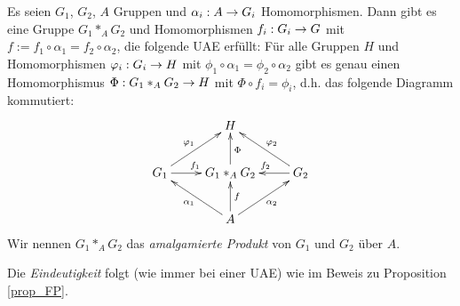 \documentclass[a4paper, 12pt, twoside]{article}
\begin{document}
\PROP\label{prop_AP}
Es seien $G_1$, $G_2$, $A$ Gruppen und $\alpha_i:A\rightarrow G_i$
Homomorphismen.
Dann gibt es eine Gruppe $G_1*_A G_2$ und Homomorphismen
$f_i:G_i\rightarrow G$ mit $f:=f_1\circ \alpha_1=f_2\circ\alpha_2$,
die folgende UAE erfüllt:
Für alle Gruppen $H$ und Homomorphismen $\varphi_i:G_i\rightarrow H$ mit
$\phi_1\circ\alpha_1=\phi_2\circ\alpha_2$ gibt es genau einen
Homomorphismus $\Phi:G_1 *_A G_2 \rightarrow H$ mit $\Phi\circ f_i=\phi_i$,
d.h. das folgende Diagramm kommutiert:
\[\xymatrix{
& H & \\
G_1 \ar[r]^{f_1} \ar[ur]^{\phi_1} &
	G_1*_A G_2 \ar[u]_{\Phi} &
	G_2 \ar[l]_{f_2} \ar[ul]_{\phi_2}\\
& A \ar[ul]^{\alpha_1} \ar[ur]_{\alpha_2}  \ar[u]_{f}&
}\]
Wir nennen $G_1*_A G_2$ das \emph{amalgamierte Produkt}
von $G_1$ und $G_2$ über $A$.

\bew Die \textsl{Eindeutigkeit} folgt (wie immer bei einer UAE) wie
im Beweis zu Proposition \ref{prop_FP}.
\end{document}
